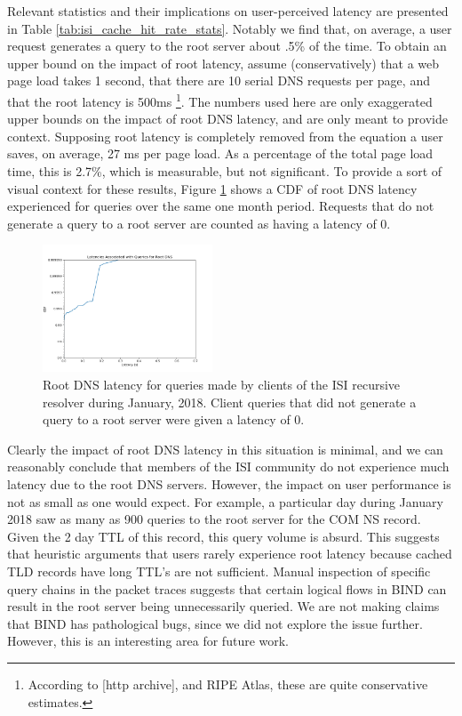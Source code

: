 \documentclass[sigconf,nonacm,10pt]{acmart}
\begin{document}
Relevant statistics and their implications on user-perceived latency are
presented in Table \ref{tab:isi_cache_hit_rate_stats}. Notably we find
that, on average, a user request generates a query to the root server
about .5\% of the time. To obtain an upper bound on the impact of root
latency, assume (conservatively) that a web page load takes 1 second,
that there are 10 serial DNS requests per page, and that the root
latency is 500ms
\footnote{ According to [http archive], and RIPE Atlas, these are quite conservative estimates. }.
The numbers used here are only exaggerated upper bounds on the impact of
root DNS latency, and are only meant to provide context. Supposing root
latency is completely removed from the equation a user saves, on
average, 27 ms per page load. As a percentage of the total page load
time, this is 2.7\%, which is measurable, but not significant. To
provide a sort of visual context for these results, Figure
\ref{fig:isi_root_dns_latency} shows a CDF of root DNS latency
experienced for queries over the same one month period. Requests that do
not generate a query to a root server are counted as having a latency of
0.

\begin{figure}
    \centering
    \includegraphics[width=0.45\textwidth]{figures/isi_root_dns_latency.png}
    \caption{Root DNS latency for queries made by clients of the ISI recursive resolver during January, 2018. Client queries that did not generate a query to a root server were given a latency of 0. }
    \label{fig:isi_root_dns_latency}
\end{figure}

Clearly the impact of root DNS latency in this situation is minimal, and
we can reasonably conclude that members of the ISI community do not
experience much latency due to the root DNS servers. However, the impact
on user performance is not as small as one would expect. For example, a
particular day during January 2018 saw as many as 900 queries to the
root server for the COM NS record. Given the 2 day TTL of this record,
this query volume is absurd. This suggests that heuristic arguments that
users rarely experience root latency because cached TLD records have
long TTL's are not sufficient. Manual inspection of specific query
chains in the packet traces suggests that certain logical flows in BIND
can result in the root server being unnecessarily queried. We are not
making claims that BIND has pathological bugs, since we did not explore
the issue further. However, this is an interesting area for future work.
\end{document}
